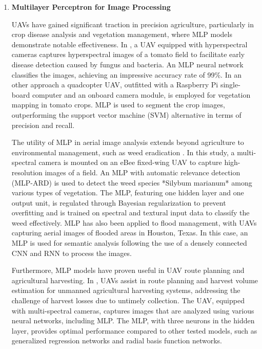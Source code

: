 \begin{enumerate}
    \item \textbf{Multilayer Perceptron for Image Processing}

    UAVs have gained significant traction in precision agriculture, particularly in crop disease analysis and vegetation management, where MLP models demonstrate notable effectiveness. In \cite{Abdulridha2020}, a UAV equipped with hyperspectral cameras captures hyperspectral images of a tomato field to facilitate early disease detection caused by fungus and bacteria. An MLP neural network classifies the images, achieving an impressive accuracy rate of 99\%. In an other approach a quadcopter UAV, outfitted with a Raspberry Pi single-board computer and an onboard camera module, is employed for vegetation mapping in tomato crops. MLP is used to segment the crop images, outperforming the support vector machine (SVM) alternative in terms of precision and recall.

    The utility of MLP in aerial image analysis extends beyond agriculture to environmental management, such as weed eradication \cite{Tamouridou2017}. In this study, a multi-spectral camera is mounted on an eBee fixed-wing UAV to capture high-resolution images of a field. An MLP with automatic relevance detection (MLP-ARD) is used to detect the weed species *Silybum marianum* among various types of vegetation. The MLP, featuring one hidden layer and one output unit, is regulated through Bayesian regularization to prevent overfitting and is trained on spectral and textural input data to classify the weed effectively. MLP has also been applied to flood management, with UAVs capturing aerial images of flooded areas in Houston, Texas. In this case, an MLP is used for semantic analysis following the use of a densely connected CNN and RNN to process the images.
    
    Furthermore, MLP models have proven useful in UAV route planning and agricultural harvesting. In \cite{annepu2020uav}, UAVs assist in route planning and harvest volume estimation for unmanned agricultural harvesting systems, addressing the challenge of harvest losses due to untimely collection. The UAV, equipped with multi-spectral cameras, captures images that are analyzed using various neural networks, including MLP. The MLP, with three neurons in the hidden layer, provides optimal performance compared to other tested models, such as generalized regression networks and radial basis function networks.
    


\end{enumerate}
